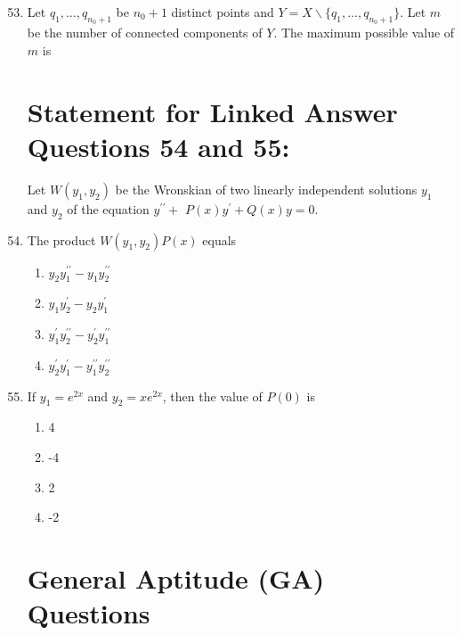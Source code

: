 \documentclass[journal]{IEEEtran}
\begin{document}
\begin{enumerate}
		\setcounter{enumi}{52} 

 
    \item Let $q_{1}, \ldots, q_{n_{0}+1}$ be $n_{0}+1$ distinct points and $Y=X \backslash\{q_{1}, \ldots, q_{n_{0}+1}\}$. Let $m$ be the number of connected components of $Y$. The maximum possible value of $m$ is $\qquad$
    \\
    \section*{Statement for Linked Answer Questions 54 and 55:}Let $W\left(y_{1}, y_{2}\right)$ be the Wronskian of two linearly independent solutions $y_{1}$ and $y_{2}$ of the equation $y^{\prime \prime}+$ $P(x) y^{\prime}+Q(x) y=0$.
    
  \item The product $W(y_{1}, y_{2}) P(x)$ equals
   \begin{multicols}{4}
			\begin{enumerate}

\item  $y_{2} y_{1}^{\prime \prime}-y_{1} y_{2}^{\prime \prime}$
\item  $y_{1} y_{2}^{\prime}-y_{2} y_{1}^{\prime}$
\item $y_{1}^{\prime} y_{2}^{\prime \prime}-y_{2}^{\prime} y_{1}^{\prime \prime}$

\item $y_{2}^{\prime} y_{1}^{\prime}-y_{1}^{\prime \prime} y_{2}^{\prime \prime}$

        \end{enumerate}
		\end{multicols}
  \item  If $y_{1}=e^{2 x}$ and $y_{2}=x e^{2 x}$, then the value of $P(0)$ is
   \begin{multicols}{4}
			\begin{enumerate}
\item  4
\item -4
\item 2
\item -2

  \end{enumerate}
		\end{multicols}
  \section*{General Aptitude (GA) Questions}

\end{enumerate}
\end{document}
